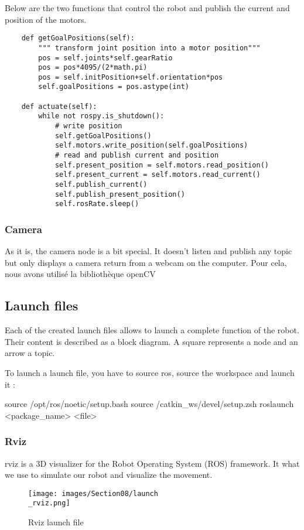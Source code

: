 \bigbreak
Below are the two functions that control the robot and publish the current and position of the motors.
\begin{verbatim}
    def getGoalPositions(self):
        """ transform joint position into a motor position"""
        pos = self.joints*self.gearRatio
        pos = pos*4095/(2*math.pi)
        pos = self.initPosition+self.orientation*pos
        self.goalPositions = pos.astype(int)
        
    def actuate(self):
        while not rospy.is_shutdown():
            # write position
            self.getGoalPositions()
            self.motors.write_position(self.goalPositions)
            # read and publish current and position
            self.present_position = self.motors.read_position()
            self.present_current = self.motors.read_current()
            self.publish_current()
            self.publish_present_position()
            self.rosRate.sleep()
\end{verbatim}

\subsubsection{Camera}
As it is, the camera node is a bit special. It doesn't listen and publish any topic but only displays a camera return from a webcam on the computer. Pour cela, nous avons utilisé la bibliothèque openCV

\subsection{Launch files}

Each of the created launch files allows to launch a complete function of the robot. Their content is described as a block diagram. A square represents a node and an arrow a topic. 

\bigbreak
To launch a launch file, you have to source ros, source the workspace and launch it :
\begin{commandshell}
    source /opt/ros/noetic/setup.bash
    source /catkin_ws/devel/setup.zsh
    roslaunch <package_name> <file>
\end{commandshell} 

\subsubsection{Rviz}

rviz is a 3D visualizer for the Robot Operating System (ROS) framework. It what we use to simulate our robot and visualize the movement.
\bigbreak
\begin{figure}[ht]
    \centering
    \texttt{[image: images/Section08/launch\\\_rviz.png]}
    \caption{Rviz launch file}
    \label{fig:mesh21}
\end{figure}
\FloatBarrier

